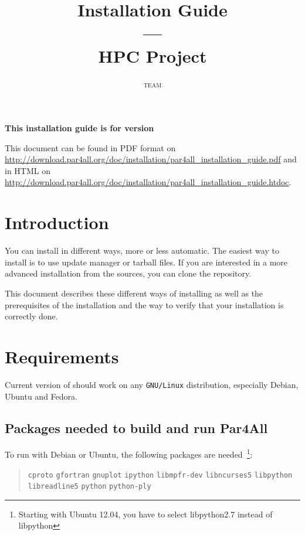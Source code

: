 \documentclass[a4paper]{article}
\newcommand{\LINK}[1]{\url{#1}\xspace}
\newcommand{\PfaInstallationPDF}{\LINK{http://download.par4all.org/doc/installation/par4all_installation_guide.pdf}}
\newcommand{\PfaAllInstallationHTDOC}{\LINK{http://download.par4all.org/doc/installation/par4all_installation_guide.htdoc}}
\begin{document}
\title{\protect\Apfa Installation Guide\\
  ---\\
  HPC Project}

\author{\Apfa \textsc{team}}

\maketitle

\noindent\textbf{This installation guide is for \Apfa version }
\bigskip

This document can be found in PDF format on \PfaInstallationPDF and in HTML
on \PfaAllInstallationHTDOC.


\section{Introduction}
\label{sec:introduction}


You can install \Apfa in different ways, more or less automatic. The easiest
way to install \Apfa is to use update manager or tarball files. If you are
interested in a more advanced installation from the sources, you can clone
the \Apfa{} \Agit repository.

This document describes these different ways of installing \Apfa as well
as the prerequisites of the installation and the way to verify that your
installation is correctly done.


\section{Requirements}
\label{sec:requirements}

Current version of \Apfa should work on any \texttt{GNU/Linux}
distribution, especially Debian, Ubuntu and Fedora.


\subsection{Packages needed to build and run Par4All}
\label{sec:pack-need-build}


To run \Apfa with Debian or Ubuntu, the following packages are needed~\footnote
{Starting with Ubuntu 12.04, you have to select libpython2.7 instead of 
libpython}:
\begin{quote}
  \texttt{cproto} \texttt{gfortran} \texttt{gnuplot} \texttt{ipython}
  \texttt{libmpfr-dev} \texttt{libncurses5} \texttt{libpython}  
  \texttt{libreadline5} \texttt{python} \texttt{python-ply}
\end{quote}
\end{document}
